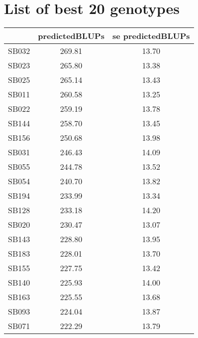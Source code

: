 \documentclass[a4paper,11pt]{article}\usepackage[]{graphicx}\usepackage[]{color}
\begin{document}
\section{List of best 20 genotypes}
\begin{table}[ht]
\begin{flushleft}
\begin{tabular}{lcc}
  \hline
 & predictedBLUPs & se predictedBLUPs \\ 
  \hline
SB032 & 269.81 & 13.70 \\ 
  SB023 & 265.80 & 13.38 \\ 
  SB025 & 265.14 & 13.43 \\ 
  SB011 & 260.58 & 13.25 \\ 
  SB022 & 259.19 & 13.78 \\ 
  SB144 & 258.70 & 13.45 \\ 
  SB156 & 250.68 & 13.98 \\ 
  SB031 & 246.43 & 14.09 \\ 
  SB055 & 244.78 & 13.52 \\ 
  SB054 & 240.70 & 13.82 \\ 
  SB194 & 233.99 & 13.34 \\ 
  SB128 & 233.18 & 14.20 \\ 
  SB020 & 230.47 & 13.07 \\ 
  SB143 & 228.80 & 13.95 \\ 
  SB183 & 228.01 & 13.70 \\ 
  SB155 & 227.75 & 13.42 \\ 
  SB140 & 225.93 & 14.00 \\ 
  SB163 & 225.55 & 13.68 \\ 
  SB093 & 224.04 & 13.87 \\ 
  SB071 & 222.29 & 13.79 \\ 
   \hline
\end{tabular}
\label{bestTab}
\end{flushleft}
\end{table}

\end{document}
